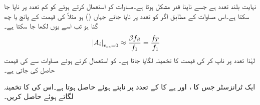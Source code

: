  نہایت بلند تعدد ہے جسے ناپنا قدر مشکل ہوتا ہے۔مساوات  کو استعمال کرتے ہوئے  کو کم تعدد پر ناپا جا سکتا ہے۔اس مساوات کے مطابق اگر  کو تعدد  پر ناپا جائے جہاں () ہو مثلاً  کی قیمت  کے پانچ یا چھ گنا ہو تب اسے یوں لکھا جا سکتا ہے۔
\begin{align} \label{مساوات_تعددی_ردعمل_کسر_دور_انقطاعی_تعدد_تخمینہ}
\abs{A_i}_{v_{ce}=0}& \approx \frac{\beta f_{\beta}}{f_1}=\frac{f_T}{f_1}
\end{align}
لہٰذا  تعدد پر  ناپ کر  کی قیمت کا تخمینہ لگایا جاتا ہے۔ کو استعمال کرتے ہوئے مساوات  سے   کی قیمت حاصل کی جاتی ہے۔

ایک ٹرانزسٹر جس کا ، اور  ہے کا  کے تعدد  پر  ناپتے ہوئے حاصل ہوتا ہے۔اس کی  کا تخمینہ لگاتے ہوئے  حاصل کریں۔

